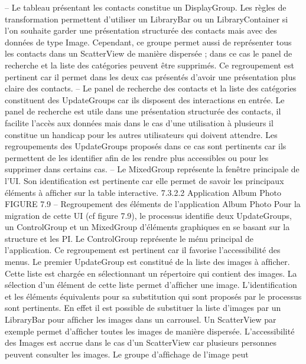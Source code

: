\documentclass{article}
\begin{document}
– Le tableau pr\'{e}sentant les contacts constitue un DisplayGroup. Les r\`{e}gles de transformation
permettent d’utiliser un LibraryBar ou un LibraryContainer si l’on souhaite garder une pr\'{e}sentation structur\'{e}e des contacts mais avec des donn\'{e}es de type Image. Cependant, ce groupe
permet aussi de repr\'{e}senter tous les contacts dans un ScatterView de mani\`{e}re dispers\'{e}e ; dans
ce cas le panel de recherche et la liste des cat\'{e}gories peuvent \^{e}tre supprim\'{e}s. Ce regroupement
est pertinent car il permet dans les deux cas pr\'{e}sent\'{e}s d’avoir une pr\'{e}sentation plus claire des
contacts.
– Le panel de recherche des contacts et la liste des cat\'{e}gories constituent des UpdateGroups car ils
disposent des interactions en entr\'{e}e. Le panel de recherche est utile dans une pr\'{e}sentation structur\'{e}e des contacts, il facilite l’acc\`{e}s aux donn\'{e}es mais dans le cas d’une utilisation \`{a} plusieurs
il constitue un handicap pour les autres utilisateurs qui doivent attendre. Les regroupements des
UpdateGroups propos\'{e}s dans ce cas sont pertinents car ils permettent de les identiﬁer aﬁn de
les rendre plus accessibles ou pour les supprimer dans certains cas.
– Le MixedGroup repr\'{e}sente la fen\^{e}tre principale de l’UI. Son identiﬁcation est pertinente car
elle permet de savoir les principaux \'{e}l\'{e}ments \`{a} afﬁcher sur la table interactive.
7.3.2.2
Application Album Photo
FIGURE 7.9 – Regroupement des \'{e}l\'{e}ments de l’application Album Photo
Pour la migration de cette UI (cf ﬁgure 7.9), le processus identiﬁe deux UpdateGroups, un
ControlGroup et un MixedGroup d’\'{e}l\'{e}ments graphiques en se basant sur la structure et les PI.
Le ControlGroup repr\'{e}sente le m\'{e}nu principal de l’application. Ce regroupement est pertinent car
il favorise l’accessibilit\'{e} des menus.
Le premier UpdateGroup est constitu\'{e} de la liste des images \`{a} afﬁcher. Cette liste est charg\'{e}e en
s\'{e}lectionnant un r\'{e}pertoire qui contient des images. La s\'{e}lection d’un \'{e}l\'{e}ment de cette liste permet
d’afﬁcher une image. L’identiﬁcation et les \'{e}l\'{e}ments \'{e}quivalents pour sa substitution qui sont propos\'{e}s par le processus sont pertinents. En effet il est possible de substituer la liste d’images par un
LibraryBar pour afﬁcher les images dans un carrousel. Un ScatterView par exemple permet d’afﬁcher
toutes les images de mani\`{e}re dispers\'{e}e. L’accessibilit\'{e} des Images est accrue dans le cas d’un ScatterView car plusieurs personnes peuvent consulter les images. Le groupe d’afﬁchage de l’image peut
\end{document}
